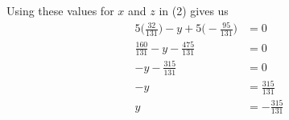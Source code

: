 \documentclass[12pt]{article}
\begin{document}
Using these values for $x$ and $z$ in (2) gives us
\begin{align*}
5\bigg(\displaystyle \frac{32}{131}\bigg)-y+5\bigg(-\displaystyle \frac{95}{131}\bigg)&=0 \\
\displaystyle \frac{160}{131}-y-\displaystyle \frac{475}{131}&=0 \\
-y-\displaystyle \frac{315}{131}&=0 \\
-y&=\displaystyle \frac{315}{131} \\
y&=-\displaystyle \frac{315}{131}
\end{align*}
\end{document}
